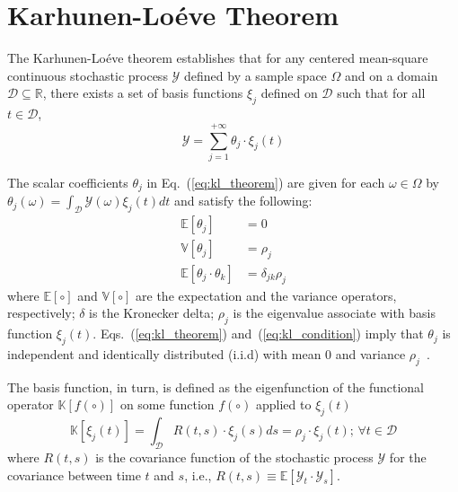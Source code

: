 \section{Karhunen-Lo\'eve Theorem}\label{app:kl_theorem}

The Karhunen-Lo\'eve theorem establishes that for any centered mean-square continuous stochastic process $\mathcal{Y}$ defined by a sample space $\Omega$ and on a domain $\mathcal{D} \subseteq \mathbb{R}$,
there exists a set of basis functions ${\xi_j}$ defined on $\mathcal{D}$ such that for all $t \in \mathcal{D}$,
\begin{equation}
	\mathcal{Y} = \sum_{j=1}^{+\infty} \theta_j \cdot \xi_j(t)
\label{eq:kl_theorem}
\end{equation}

The scalar coefficients $\theta_j$ in Eq.~(\ref{eq:kl_theorem}) are given for each $\omega \in \Omega$ by $\theta_j(\omega) = \int_\mathcal{D} \mathcal{Y}(\omega) \xi_j(t) dt$ and satisfy the following:
\begin{equation}
	\begin{split}
		\mathbb{E}[\theta_j] & = 0 \\
		\mathbb{V}[\theta_j] & = \rho_j \\
    \mathbb{E}[\theta_j\cdot \theta_k] & = \delta_{jk} \rho_j
	\end{split}
\label{eq:kl_condition}
\end{equation}
where $\mathbb{E}[\circ]$ and $\mathbb{V}[\circ]$ are the expectation and the variance operators, respectively;
$\delta$ is the Kronecker delta;
$\rho_j$ is the eigenvalue associate with basis function $\xi_j(t)$.
Eqs.~(\ref{eq:kl_theorem}) and~(\ref{eq:kl_condition}) imply that $\theta_j$ is independent and identically distributed (i.i.d) with mean $0$ and variance $\rho_j$~\cite{Wang2008}.

The basis function, in turn, is defined as the eigenfunction of the functional operator $\mathbb{K}[f(\circ)]$ on some function $f(\circ)$ applied to $\xi_j(t)$
\begin{equation}
	\mathbb{K}[\xi_j(t)] = \int_{\mathcal{D}} R (t, s) \cdot \xi_j(s) ds = \rho_j \cdot \xi_j(t); \, \forall t \in \mathcal{D}
\label{eq:kl_operator}
\end{equation}
where $R (t, s)$ is the covariance function of the stochastic process $\mathcal{Y}$ for the covariance between time $t$ and $s$,
i.e., $R (t, s) \equiv \mathbb{E}[\mathcal{Y}_t \cdot \mathcal{Y}_s]$.

